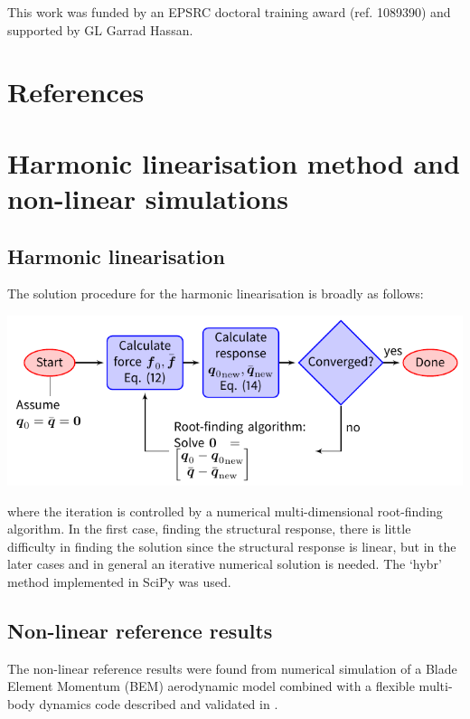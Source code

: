 \documentclass[preprint]{elsarticle}
\begin{document}
This work was funded by an EPSRC doctoral training award (ref. 1089390) and
supported by GL Garrad Hassan.

\section*{References}



\clearpage
\appendix

\section{Harmonic linearisation method and non-linear simulations}
\label{sec:appendix-method}

\subsection{Harmonic linearisation}

The solution procedure for the harmonic linearisation is broadly as
follows:

  \hspace{-1cm}
  \includegraphics{tikz/solution}

  \noindent where the iteration is controlled by a numerical multi-dimensional
  root-finding algorithm. In the first case, finding the structural response,
  there is little difficulty in finding the solution since the structural
  response is linear, but in the later cases and in general an iterative
  numerical solution is needed. The `hybr' method implemented in SciPy
  \citep{SciPy} was used.

\subsection{Non-linear reference results}
\label{sec:appendix-method-nonlinear}

The non-linear reference results were found from numerical simulation of a Blade
Element Momentum (BEM) aerodynamic model combined with a flexible multi-body
dynamics code described and validated in \citet{lupton_frequencydomain_2015}.
\end{document}
